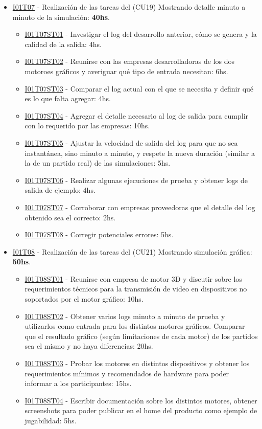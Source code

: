 \begin{itemize}
\item \underline{I01T07} - Realización de las tareas del (CU19) Mostrando detalle minuto a minuto de la simulación: \textbf{40hs}.
  \begin{itemize}
    \item \underline{I01T07ST01} - Investigar el log del desarrollo anterior, cómo se genera y la calidad de la salida: 4hs.
    \item \underline{I01T07ST02} - Reunirse con las empresas desarrolladoras de los dos motoroes gráficos y averiguar qué tipo de entrada necesitan: 6hs.
    \item \underline{I01T07ST03} - Comparar el log actual con el que se necesita y definir qué es lo que falta agregar: 4hs.
    \item \underline{I01T07ST04} - Agregar el detalle necesario al log de salida para cumplir con lo requerido por las empresas: 10hs.
    \item \underline{I01T07ST05} - Ajustar la velocidad de salida del log para que no sea instantánea, sino minuto a minuto, y respete la nueva duración (similar a la de un partido real) de las simulaciones: 5hs.
    \item \underline{I01T07ST06} - Realizar algunas ejecuciones de prueba y obtener logs de salida de ejemplo: 4hs.
    \item \underline{I01T07ST07} - Corroborar con empresas proveedoras que el detalle del log obtenido sea el correcto: 2hs.    
    \item \underline{I01T07ST08} - Corregir potenciales errores: 5hs.
  \end{itemize}
\hfill

\item \underline{I01T08} - Realización de las tareas del (CU21) Mostrando simulación gráfica: \textbf{50hs}.
  \begin{itemize}
    \item \underline{I01T08ST01} - Reunirse con empresa de motor 3D y discutir sobre los requerimientos técnicos para la transmisión de video en dispositivos no soportados por el motor gráfico: 10hs.
    \item \underline{I01T08ST02} - Obtener varios logs minuto a minuto de prueba y utilizarlos como entrada para los distintos motores gráficos. Comparar que el resultado gráfico (según limitaciones de cada motor) de los partidos sea el mismo y no haya diferencias: 20hs.
    \item \underline{I01T08ST03} - Probar los motores en distintos dispositivos y obtener los requerimientos mínimos y recomendados de hardware para poder informar a los participantes: 15hs.
    \item \underline{I01T08ST04} - Escribir documentación sobre los distintos motores, obtener screenshots para poder publicar en el home del producto como ejemplo de jugabilidad: 5hs.
  \end{itemize}
\hfill



\end{itemize}
